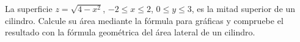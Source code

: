 La superficie $z=\sqrt{4-x^2}$, $-2\leq x\leq2$, $0\leq y\leq3$, es la mitad superior de un cilindro. Calcule su área mediante la fórmula para gráficas y compruebe el resultado con la fórmula geométrica del área lateral de un cilindro.
